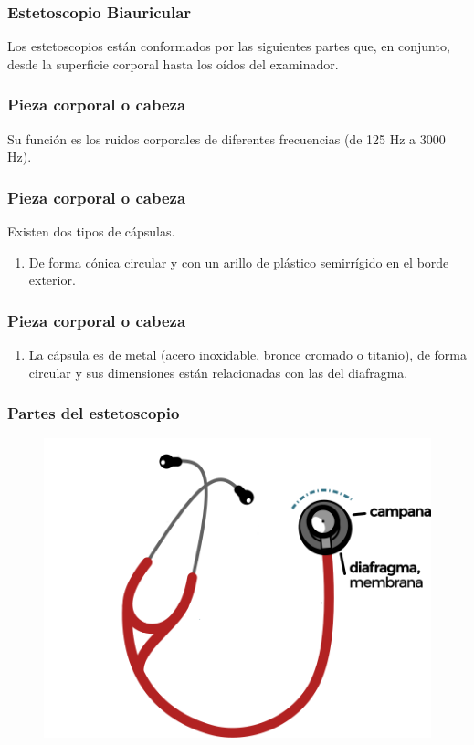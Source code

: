 \documentclass[14pt]{beamer}
\begin{document}
\begin{frame}
\frametitle{Estetoscopio Biauricular}
Los estetoscopios están conformados por las siguientes partes que, en conjunto, \pause {} desde la superficie corporal hasta los oídos del examinador.
\end{frame}
\begin{frame}
\frametitle{Pieza corporal o cabeza}
Su función es  los ruidos corporales de diferentes frecuencias (de 125 Hz a 3000 Hz).
\end{frame}
\begin{frame}
\frametitle{Pieza corporal o cabeza}
Existen dos tipos de cápsulas.
\pause
{}
\begin{enumerate}[<+->]
\item {}

De forma cónica circular y con un arillo de plástico semirrígido en el borde exterior.
\seti
\end{enumerate}
\end{frame}
\begin{frame}
\frametitle{Pieza corporal o cabeza}
\begin{enumerate}[<+->]
\conti
\item {}

La cápsula es de metal (acero inoxidable, bronce cromado o titanio), de forma circular y sus dimensiones están relacionadas con las del diafragma.
\end{enumerate}
\end{frame}
\begin{frame}
\frametitle{Partes del estetoscopio}
\vspace*{-1cm}
\begin{figure}
    \centering
    \includegraphics[scale=0.7]{Imagenes/Estetoscopio_03.png}
\end{figure}
\end{frame}
\end{document}
